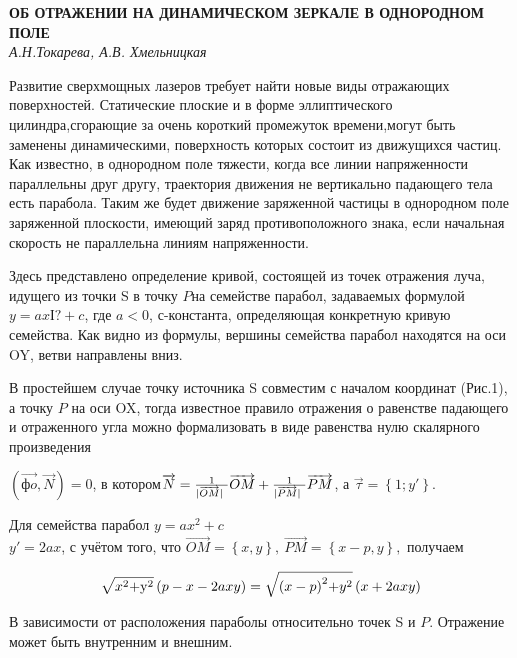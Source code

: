 \begin{center}{ \bf  ОБ ОТРАЖЕНИИ НА ДИНАМИЧЕСКОМ ЗЕРКАЛЕ В ОДНОРОДНОМ ПОЛЕ}\\
{\it А.Н.Токарева, А.В. Хмельницкая} \\
\end{center}

Развитие сверхмощных лазеров требует найти новые виды отражающих поверхностей. Статические плоские и в форме эллиптического цилиндра,сгорающие за очень короткий промежуток времени,могут быть заменены динамическими, поверхность которых состоит из движущихся частиц. Как известно, в однородном поле тяжести, когда все линии напряженности параллельны друг другу, траектория движения не вертикально падающего тела есть парабола. Таким же будет движение заряженной частицы в однородном поле заряженной плоскости, имеющий заряд противоположного знака, если начальная скорость не параллельна линиям напряженности.

Здесь представлено определение кривой, состоящей из точек отражения луча, идущего из точки S в точку $P$на семействе парабол, задаваемых формулой $y=axІ?+c$, где $a<0$, $с$-константа, определяющая конкретную кривую семейства. Как видно из формулы, вершины семейства парабол находятся на оси OY, ветви направлены вниз.

В простейшем случае точку источника S совместим с началом координат (Рис.1), а точку $P$ на оси OX, тогда известное правило отражения о равенстве падающего и отраженного угла можно формализовать в виде равенства нулю скалярного произведения

$(\overrightarrow{фo},\overrightarrow{N})=0$, в котором$\overrightarrow{N}=\frac{{\rm 1}}{|\overrightarrow{OM}|\ }\overrightarrow{OM}+\frac{{\rm 1}}{|\overrightarrow{PM}|\ }\overrightarrow{PM}$, а $\overrightarrow{\tau }=\left\{1;y'\right\}.$

Для семейства парабол $y=ax^2+c$\\
$y'=2ax$, с учётом того, что $\overrightarrow{OM}=\left\{x,y\right\},\ \overrightarrow{PM}=\left\{x-p,y\right\},$ получаем

\begin{equation} \label{GrindEQ__1_} \sqrt{x^{{\rm 2}}{\rm +}{{\rm y}}^{{\rm 2}}}\left(p-x-2axy\right)=\sqrt{(x-{p)}^{{\rm 2}}{\rm +}y^{{\rm 2}}}\left(x+2axy\right) \end{equation}

В зависимости от расположения параболы относительно точек S и $P$. Отражение может быть внутренним и внешним.

